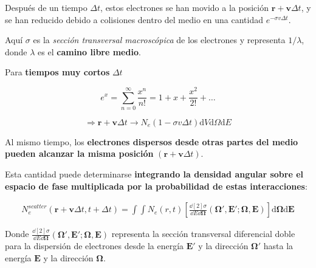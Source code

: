 \documentclass[aspectratio=169,xcolor=dvipsnames,t]{beamer}
\newcommand{\be}{\begin{equation*}}
\newcommand{\ee}{\end{equation*}}
\newcommand{\bae}{\begin{eqnarray}}
\newcommand{\eae}{\end{eqnarray}}
\newcommand{\kl}{\left[}
\newcommand{\kr}{\right]}
\begin{document}
\begin{frame}

    Después de un tiempo $\Delta t$, estos electrones se han movido a la posición $\mathbf{r} + \mathbf{v} \Delta t $, y se han reducido debido a colisiones dentro del medio en una cantidad $e^{-\sigma v \Delta t}$.

    Aquí $\sigma$ es la \textit{sección transversal macroscópica} de los electrones y representa $1/\lambda$, donde $\lambda$ es el \textbf{camino libre medio}.

    Para \textbf{tiempos muy cortos} $\Delta t$

    \begin{center}
        \begin{tcolorbox}[colback=gray!25!white,colframe=gray, title=\textbf{Serie de Taylor (exponencial)},width=0.5\linewidth, center title]
            \vspace{-0.5cm}
            \be
                e^{x} = \sum_{n=0}^{\infty} \frac{x^{n}}{n!} = 1 + x + \frac{x^2}{2!} + \dots
            \ee
        \end{tcolorbox}
    \end{center}

    \be
    \Rightarrow \mathbf{r} + \mathbf{v} \Delta t \rightarrow N_e(1-\sigma v \Delta t) \text{d}V \text{d}\Omega \text{d}E
    \ee

\end{frame}

\begin{frame}

    \vspace{0.6cm}

    Al mismo tiempo, los \textbf{electrones dispersos desde otras partes del medio pueden alcanzar la misma posición} $(\mathbf{r} + \mathbf{v} \Delta t)$.

    Esta cantidad puede determinarse \textbf{integrando la densidad angular sobre el espacio de fase multiplicada por la probabilidad de estas interacciones}:

    \bae
    N_e^{scatter}(\mathbf{r} + \mathbf{v} \Delta t , t + \Delta t) = \int \int N_e(r,t) \kl \frac{\dd[2]{\sigma}}{\dd E \dd \bm{\Omega}} (\bm{\Omega}',\mathbf{E}';\bm{\Omega},\mathbf{E}) \kr \text{d}\bm{\Omega} \text{d}\mathbf{E}
    \eae

    Donde $\frac{\dd[2]{\sigma}}{\dd E \dd \bm{\Omega}} (\bm{\Omega}',\mathbf{E}';\bm{\Omega},\mathbf{E})$ representa la sección transversal diferencial doble para la dispersión de electrones desde la energía $\mathbf{E}'$ y la dirección $\bm{\Omega}'$ hasta la energía $\mathbf{E}$ y la dirección $\bm{\Omega}$.

\end{frame}
\end{document}
